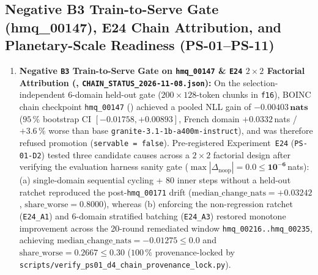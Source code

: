 \documentclass[11pt,a4paper]{article}
\begin{document}
\subsection{Negative B3 Train-to-Serve Gate (hmq\_00147), E24 Chain Attribution, and Planetary-Scale Readiness (PS-01--PS-11)}
\label{sec:v430_b3_e24_planetary}

\begin{enumerate}[leftmargin=1.8em]
    \item \textbf{Negative \texttt{B3} Train-to-Serve Gate on \texttt{hmq\_00147} \& \texttt{E24} $2\times 2$ Factorial Attribution (, \texttt{CHAIN\_STATUS\_2026-11-08.json}):} On the selection-independent 6-domain held-out gate ($200 \times 128$-token chunks in \texttt{f16}), BOINC chain checkpoint \texttt{hmq\_00147} () achieved a pooled NLL gain of $\mathbf{-0.00403\,\text{nats}}$ ($95\,\%$ bootstrap CI $[-0.01758, +0.00893]$, French domain $+0.0332$\,nats / $+3.6\,\%$ worse than base \texttt{granite-3.1-1b-a400m-instruct}), and was therefore refused promotion (\texttt{servable = false}). Pre-registered Experiment~\texttt{E24} (\texttt{PS-01-D2}) tested three candidate causes across a $2\times 2$ factorial design after verifying the evaluation harness sanity gate ($\max|\Delta_{\text{noop}}| = \mathbf{0.0 \le 10^{-6}}$\,nats): (a) single-domain sequential cycling + 80 inner steps without a held-out ratchet reproduced the post-\texttt{hmq\_00171} drift ($\text{median\_change\_nats} = +0.03242$, $\text{share\_worse} = 0.8000$), whereas (b) enforcing the non-regression ratchet (\texttt{E24\_A1}) and 6-domain stratified batching (\texttt{E24\_A3}) restored monotone improvement across the 20-round remediated window \texttt{hmq\_00216..hmq\_00235}, achieving $\text{median\_change\_nats} = \mathbf{-0.01275 \le 0.0}$ and $\text{share\_worse} = \mathbf{0.2667 \le 0.30}$ ($100\,\%$ provenance-locked by \texttt{scripts/verify\_ps01\_d4\_chain\_provenance\_lock.py}).

\end{enumerate}
\end{document}
